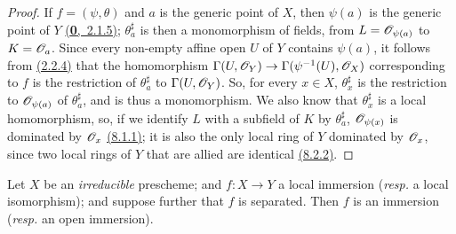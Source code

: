 \begin{proof}
\label{proof-prop-1.8.2.7}
If $f=(\psi,\theta)$ and $a$ is the generic point of $X$, then
$\psi(a)$ is the generic point of $Y$ \hyperref[env-0.2.1.5]{(\textbf{0},~2.1.5)}; $\theta_a^\sharp$ is then
a monomorphism of fields, from $L=\mathscr{O}_{\psi(a)}$ to $K=\mathscr{O}_a$. Since every
non-empty affine open $U$ of $Y$ contains $\psi(a)$, it follows from
\hyperref[prop-1.2.2.4]{(2.2.4)} that the homomorphism $\Gamma(U,\mathscr{O}_Y)\to\Gamma(\psi^{-1}(U),\mathscr{O}_X)$
corresponding to $f$ is the restriction of $\theta_a^\sharp$ to $\Gamma(U,\mathscr{O}_Y)$.
So, for every $x\in X$, $\theta_x^\sharp$ is the restriction to $\mathscr{O}_{\psi(a)}$ of
$\theta_a^\sharp$, and is thus a monomorphism. We also know that $\theta_x^\sharp$ is a
local homomorphism, so, if we identify $L$ with a subfield of $K$ by
$\theta_a^\sharp$, $\mathscr{O}_{\psi(x)}$ is dominated by $\mathscr{O}_x$ \hyperref[lem-1.8.1.1]{(8.1.1)}; it is also
the only local ring of $Y$ dominated by $\mathscr{O}_x$, since two local rings of $Y$
that are allied are identical \hyperref[prop-1.8.2.2]{(8.2.2)}.
\end{proof}

\begin{prop}[8.2.8]
\label{prop-1.8.2.8}
Let $X$ be an {\it irreducible} prescheme; and
$f:X\to Y$ a local immersion ({\it resp.} a local isomorphism); and
suppose further that $f$ is separated. Then $f$ is an immersion ({\it resp.}
an open immersion).
\end{prop}

